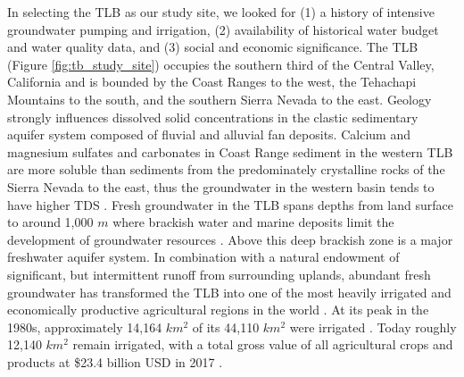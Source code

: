 In selecting the TLB as our study site, we looked for (1) a history of intensive groundwater pumping and irrigation, (2) availability of historical water budget and water quality data, and (3) social and economic significance. The TLB (Figure \ref{fig:tb_study_site}) occupies the southern third of the Central Valley, California and is bounded by the Coast Ranges to the west, the Tehachapi Mountains to the south, and the southern Sierra Nevada to the east. Geology strongly influences dissolved solid concentrations in the clastic sedimentary aquifer system composed of fluvial and alluvial fan deposits. Calcium and magnesium sulfates and carbonates in Coast Range sediment in the western TLB are more soluble than sediments from the predominately crystalline rocks of the Sierra Nevada to the east, thus the groundwater in the western basin tends to have higher TDS \citep{Fujii1995, belitz1990, deverel1988}. Fresh groundwater in the TLB spans depths from land surface to around 1,000 $m$ where brackish water and marine deposits limit the development of groundwater resources \citep{Program2010, Kang2016}. Above this deep brackish zone is a major freshwater aquifer system. In combination with a natural endowment of significant, but intermittent runoff from surrounding uplands, abundant fresh groundwater has transformed the TLB into one of the most heavily irrigated and economically productive agricultural regions in the world \citep{Hanak2011}. At its peak in the 1980s, approximately 14,164 $km^2$ of its 44,110 $km^2$ were irrigated \citep{TNC2014}. Today roughly 12,140 $km^2$ remain irrigated, with a total gross value of all agricultural crops and products at \$23.4 billion USD in 2017 \citep{kern2018, kings2018, fresno2018, tulare2018}. 


